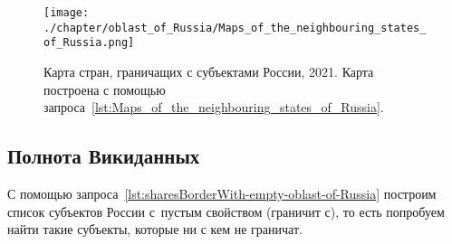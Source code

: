 \begin{fullwidth}
\begin{figure*}[h]
	\texttt{[image: ./chapter/oblast\_of\_Russia/Maps\_of\_the\_neighbouring\_states\_of\_Russia.png]}
	\caption[Карта стран, граничащих с Россией, 2021 год.]{Карта стран, граничащих с субъектами России, 2021. Карта построена с помощью запроса~\protect\ref{lst:Maps_of_the_neighbouring_states_of_Russia}.}%
      \label{fig:MapsoftheneighbouringstatesofRussia}%
\end{figure*} 
\end{fullwidth}



\subsection{Полнота Викиданных}

С помощью запроса~\ref{lst:sharesBorderWith-empty-oblast-of-Russia} 
построим список субъектов России 
с~пустым свойством  (граничит с), 
то есть попробуем найти такие субъекты, которые ни с кем не граничат.

\label{question:q_subjects_of_Russia_2}

